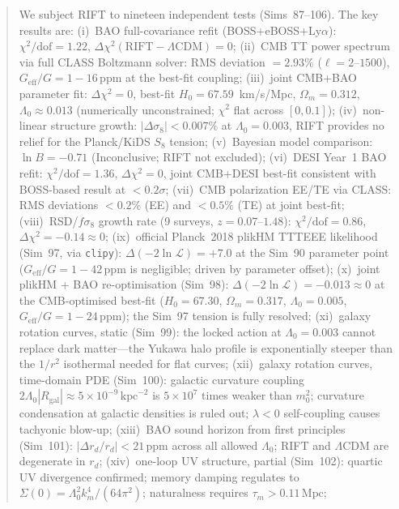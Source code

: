 \documentclass[12pt,a4paper]{article}
\begin{document}
\begin{abstract}
We subject RIFT to nineteen independent tests (Sims~87--106).
The key results are:
(i)~BAO full-covariance refit (BOSS+eBOSS+Ly$\alpha$):
    $\chi^2/\mathrm{dof}=1.22$, $\Delta\chi^2(\mathrm{RIFT}-\Lambda\mathrm{CDM})=0$;
(ii)~CMB TT power spectrum via full CLASS Boltzmann solver: RMS deviation $=2.93\%$
    ($\ell=2$--$1500$), $G_{\mathrm{eff}}/G = 1-16\,\mathrm{ppm}$ at the best-fit
    coupling;
(iii)~joint CMB+BAO parameter fit:
    $\Delta\chi^2=0$, best-fit $H_0=67.59$~km/s/Mpc, $\Omega_m=0.312$,
    $\Lambda_0\approx0.013$ (numerically unconstrained; $\chi^2$ flat across $[0,0.1]$);
(iv)~non-linear structure growth: $|\Delta\sigma_8|<0.007\%$ at $\Lambda_0=0.003$,
    RIFT provides no relief for the Planck/KiDS $S_8$ tension;
(v)~Bayesian model comparison: $\ln B = -0.71$ (Inconclusive; RIFT not excluded);
(vi)~DESI Year~1 BAO refit: $\chi^2/\mathrm{dof}=1.36$, $\Delta\chi^2=0$,
    joint CMB+DESI best-fit consistent with BOSS-based result at $<0.2\sigma$;
(vii)~CMB polarization EE/TE via CLASS: RMS deviations $<0.2\%$ (EE) and
    $<0.5\%$ (TE) at joint best-fit;
(viii)~RSD/$f\sigma_8$ growth rate (9 surveys, $z=0.07$--$1.48$):
    $\chi^2/\mathrm{dof}=0.86$, $\Delta\chi^2=-0.14\approx0$;
(ix)~official Planck~2018 plikHM TTTEEE likelihood (Sim~97, via \texttt{clipy}):
    $\Delta(-2\ln\mathcal{L})=+7.0$ at the Sim~90 parameter point
    ($G_\mathrm{eff}/G=1-42\,\mathrm{ppm}$ is negligible; driven by parameter offset);
(x)~joint plikHM + BAO re-optimisation (Sim~98): $\Delta(-2\ln\mathcal{L})=-0.013\approx 0$
    at the CMB-optimised best-fit ($H_0=67.30$, $\Omega_m=0.317$, $\Lambda_0=0.005$,
    $G_\mathrm{eff}/G=1-24\,\mathrm{ppm}$); the Sim~97 tension is fully resolved;
(xi)~galaxy rotation curves, static (Sim~99): the locked action at $\Lambda_0=0.003$
    cannot replace dark matter---the Yukawa halo profile is exponentially steeper
    than the $1/r^2$ isothermal needed for flat curves;
(xii)~galaxy rotation curves, time-domain PDE (Sim~100): galactic curvature coupling
    $2\Lambda_0|R_\mathrm{gal}|\approx5\times10^{-9}\,\mathrm{kpc}^{-2}$ is
    $5\times10^7$ times weaker than $m_0^2$; curvature condensation at galactic
    densities is ruled out; $\lambda<0$ self-coupling causes tachyonic blow-up;
(xiii)~BAO sound horizon from first principles (Sim~101): $|\Delta r_d/r_d|<21\,\mathrm{ppm}$
    across all allowed $\Lambda_0$; RIFT and $\Lambda$CDM are degenerate in $r_d$;
(xiv)~one-loop UV structure, partial (Sim~102): quartic UV divergence confirmed;
    memory damping regulates to $\Sigma(0)=\Lambda_0^2 k_m^4/(64\pi^2)$;
    naturalness requires $\tau_m>0.11\,\mathrm{Mpc}$;

\end{abstract}
\end{document}
